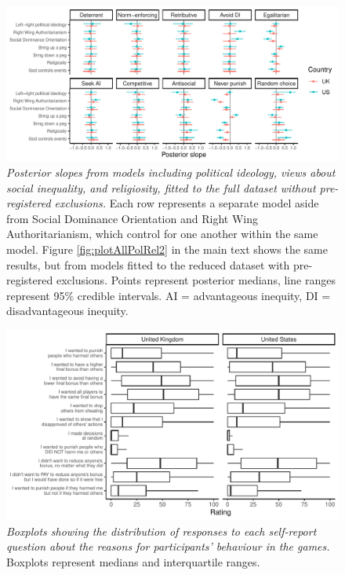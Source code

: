 \documentclass[
  man, donotrepeattitle,floatsintext]{apa6}
\begin{document}
\newpage











\begin{figure}
\centering
\includegraphics{manuscript_files/figure-latex/plotAllPolRel1-1.pdf}
\caption{\label{fig:plotAllPolRel1}\emph{Posterior slopes from models including political
ideology, views about social inequality, and religiosity, fitted to the full
dataset without pre-registered exclusions.} Each row represents a separate model
aside from Social Dominance Orientation and Right Wing Authoritarianism, which
control for one another within the same model. Figure \ref{fig:plotAllPolRel2}
in the main text shows the same results, but from models fitted to the reduced
dataset with pre-registered exclusions. Points represent posterior medians, line
ranges represent 95\% credible intervals. AI = advantageous inequity, DI =
disadvantageous inequity.}
\end{figure}

\newpage





\begin{figure}
\centering
\includegraphics{manuscript_files/figure-latex/plotSliders1-1.pdf}
\caption{\label{fig:plotSliders1}\emph{Boxplots showing the distribution of responses to each
self-report question about the reasons for participants' behaviour in the games.}
Boxplots represent medians and interquartile ranges.}
\end{figure}
\end{document}
